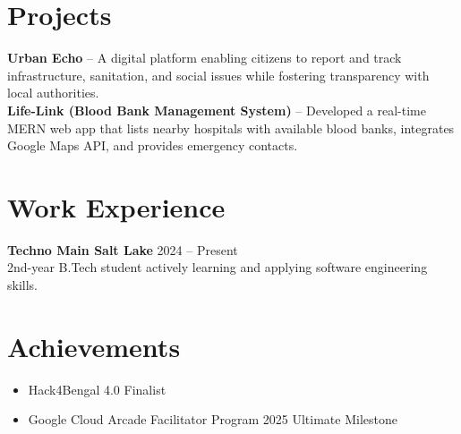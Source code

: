 \documentclass[a4paper,11pt]{article}
\begin{document}
\section{Projects}
\textbf{Urban Echo} -- A digital platform enabling citizens to report and track infrastructure, sanitation, and social issues while fostering transparency with local authorities. \\[6pt]
\textbf{Life-Link (Blood Bank Management System)} -- Developed a real-time MERN web app that lists nearby hospitals with available blood banks, integrates Google Maps API, and provides emergency contacts. 

\section{Work Experience}
\textbf{Techno Main Salt Lake} \hfill 2024 -- Present \\
2nd-year B.Tech student actively learning and applying software engineering skills. 

\section{Achievements}
\begin{itemize}[leftmargin=*]
    \item Hack4Bengal 4.0 Finalist
    \item Google Cloud Arcade Facilitator Program 2025 Ultimate Milestone
\end{itemize}
\end{document}
